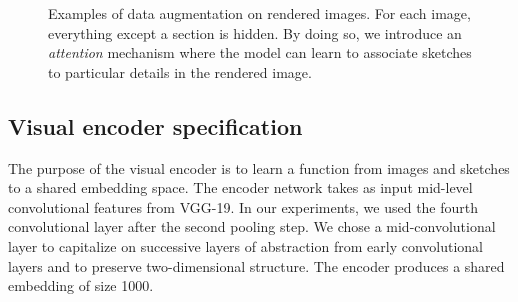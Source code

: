 \documentclass[9pt,twocolumn,twoside]{pnas-new}
\begin{document}
{\begin{figure}[h!]
    \centering
    \caption{Examples of data augmentation on rendered images. For each image, everything except a section is hidden. By doing so, we introduce an \emph{attention} mechanism where the model can learn to associate sketches to particular details in the rendered image.}
    \label{fig:augment_example}
\end{figure}

\subsection*{Visual encoder specification}

The purpose of the visual encoder is to learn a function from images and sketches to a shared embedding space. The encoder network takes as input mid-level convolutional features from VGG-19. In our experiments, we used the fourth convolutional layer after the second pooling step. We chose a mid-convolutional layer to capitalize on successive layers of abstraction from early convolutional layers and to preserve two-dimensional structure. The encoder produces a shared embedding of size 1000. 

}
\end{document}
